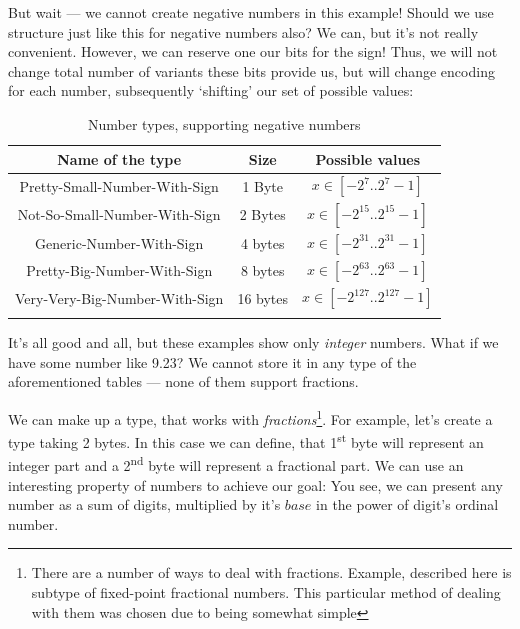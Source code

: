 \documentclass{article}
\begin{document}
            But wait --- we cannot create negative numbers in this example! Should we use structure just like this for negative numbers also? We can, but it's not really convenient.
            However, we can reserve one our bits for the sign! Thus, we will not change total number of variants these bits provide us, but will change encoding for each number, subsequently
            `shifting' our set of possible values:

            \begin{table}[H]
                \centering
                \begin{longtable}{|c|c|c|}
                    \hline
                    Name of the type & Size & Possible values \\\hline
                    Pretty-Small-Number-With-Sign & 1 Byte & $x \in [-2^7..2^7 - 1]$ \\\hline
                    Not-So-Small-Number-With-Sign & 2 Bytes & $x \in [-2^{15}..2^{15} - 1]$\\\hline
                    Generic-Number-With-Sign & 4 bytes & $x \in [-2^{31}..2^{31} - 1]$\\\hline
                    Pretty-Big-Number-With-Sign & 8 bytes & $x \in [-2^{63}..2^{63} - 1]$\\\hline
                    Very-Very-Big-Number-With-Sign & 16 bytes & $x \in [-2^{127}..2^{127} - 1]$\\\hline
                    \caption{Number types, supporting negative numbers}

                \end{longtable}
            \end{table}

            It's all good and all, but these examples show only \emph{integer} numbers. What if we have some number like 9.23?
            We cannot store it in any type of the aforementioned tables --- none of them support fractions. \par

            We can make up a type, that works with \emph{fractions}\footnote{There are a number of ways to deal with fractions. 
            Example, described here is subtype of fixed-point fractional numbers. This particular method of dealing with them was chosen due to being somewhat simple}. 
            For example, let's create a type taking 2 bytes. In this case we can define, that 1\textsuperscript{st} byte will represent an integer part and a 2\textsuperscript{nd}
            byte will represent a fractional part. We can use an interesting property of numbers to achieve our goal: You see, we can present any number as a sum of digits,
            multiplied by it's \emph{$base$} in the power of digit's ordinal number. \par
            
\end{document}
